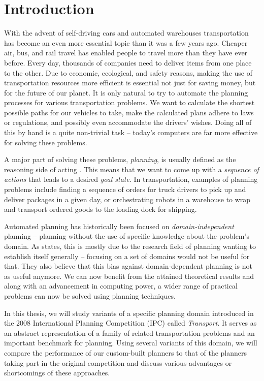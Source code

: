 \chapter*{Introduction}

With the advent of self-driving cars and automated warehouses transportation has become an even more essential topic than it was a few years ago.
Cheaper air, bus, and rail travel has enabled people to travel more than they have ever before.
Every day, thousands of companies need to deliver items from
one place to the other. Due to economic, ecological, and safety reasons, making the use of transportation resources more efficient is essential not just for saving money,
but for the future of our planet.
It is only natural to try to automate the planning processes for various transportation problems.
We want to calculate the shortest possible paths for our vehicles to take,
make the calculated plans adhere to laws or regulations, and possibly even accommodate the drivers'
wishes. Doing all of this by hand is a quite non-trivial task -- today's computers
are far more effective for solving these problems.

A major part of solving these problems, \textit{planning}, is usually defined as the reasoning side of acting \citep[Section~1.1]{Ghallab2004}.
This means that we want to come up with a \textit{sequence of actions} that leads to a desired \textit{goal state}.
In transportation, examples of planning problems include finding a sequence of orders for truck drivers to pick up and deliver packages in a given day,
or orchestrating robots in a warehouse to wrap and transport ordered goods to the loading dock for shipping.

Automated planning has historically been focused on \textit{domain-independent} planning -- planning without
the use of specific knowledge about the problem's domain.
As \citet{Nau2007} states, this is mostly due to the research field of planning wanting to
establish itself generally -- focusing on a set of domains would not be useful for that.
They also believe that this bias against domain-dependent planning is not as useful anymore.
We can now benefit from the attained theoretical results and along with an advancement in computing power,
a wider range of practical problems can now be solved using planning techniques.

In this thesis, we will study variants of a specific planning domain introduced in the 2008 International Planning Competition (IPC) called \textit{Transport}. It serves as an abstract representation of a family of related transportation problems
and an important benchmark for planning. Using several variants
of this domain, we will compare the performance of our custom-built planners to that of the planners taking part in the original competition and discuss various advantages or shortcomings of these approaches.

